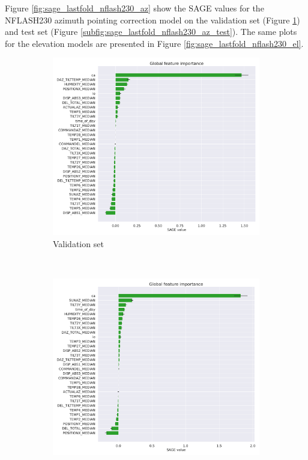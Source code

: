 Figure \ref{fig:sage_lastfold_nflash230_az} show the SAGE values for the NFLASH230 azimuth pointing correction model on the validation set (Figure \ref{subfig:sage_lastfold_nflash230_az_val})
and test set (Figure \ref{subfig:sage_lastfold_nflash230_az_test}).
The same plots for the elevation models are presented in Figure \ref{fig:sage_lastfold_nflash230_el}.

\begin{figure}[H]
    \centering
    \begin{subfigure}[t]{0.92\textwidth}
        \centering
        \includegraphics[width=\textwidth]{Results/XGB_ds2_tp5_k30_uncorr_az_val_SAGE.pdf}
        \caption{Validation set}
        \label{subfig:sage_lastfold_nflash230_az_val}
    \end{subfigure}
    \\
    \begin{subfigure}[t]{0.92\textwidth}
       \centering
       \includegraphics[width=1\textwidth]{Results/XGB_ds2_tp5_k30_uncorr_az_test_SAGE.pdf}

\end{subfigure}
\end{figure}
